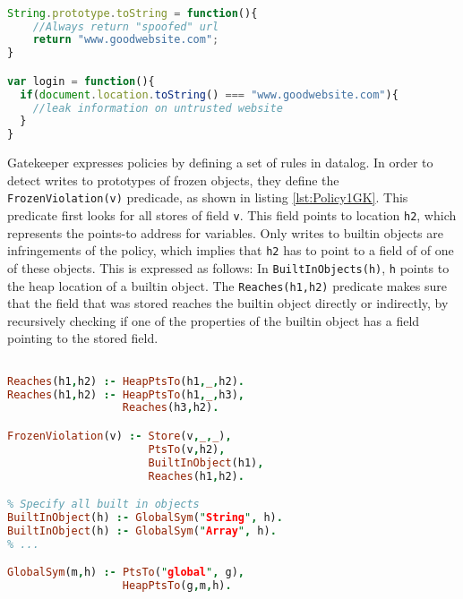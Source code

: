 \begin{lstlisting}[label={lst:PrototypePoisoning},language=JavaScript,caption=Prototype poisoning example,mathescape=true]  % float=t?

String.prototype.toString = function(){
    //Always return "spoofed" url
    return "www.goodwebsite.com";
}

var login = function(){
  if(document.location.toString() === "www.goodwebsite.com"){
    //leak information on untrusted website
  }
}
\end{lstlisting}

Gatekeeper expresses policies by defining a set of rules in datalog. In order to detect writes to prototypes of frozen objects, they define the \texttt{FrozenViolation(v)} predicade, as shown in listing \ref{lst:Policy1GK}. This predicate first looks for all stores of field \texttt{v}. This field points to location \texttt{h2}, which represents the points-to address for variables. Only writes to builtin objects are infringements of the policy, which implies that \texttt{h2} has to point to a field of of one of these objects. This is expressed as follows: In \texttt{BuiltInObjects(h)}, \texttt{h} points to the heap location of a builtin object. The \texttt{Reaches(h1,h2)} predicate makes sure that the field that was stored reaches the builtin object directly or indirectly, by recursively checking if one of the properties of the builtin object has a field pointing to the stored field.

\begin{lstlisting}[label={lst:Policy1GK},language=Prolog,caption=Policy 1 in GateKeeper,mathescape=true]  % float=t?

Reaches(h1,h2) :- HeapPtsTo(h1,_,h2).
Reaches(h1,h2) :- HeapPtsTo(h1,_,h3),
                  Reaches(h3,h2).

FrozenViolation(v) :- Store(v,_,_),
                      PtsTo(v,h2),
                      BuiltInObject(h1),
                      Reaches(h1,h2).

% Specify all built in objects
BuiltInObject(h) :- GlobalSym("String", h).
BuiltInObject(h) :- GlobalSym("Array", h).
% ...

GlobalSym(m,h) :- PtsTo("global", g),
                  HeapPtsTo(g,m,h).

\end{lstlisting}

